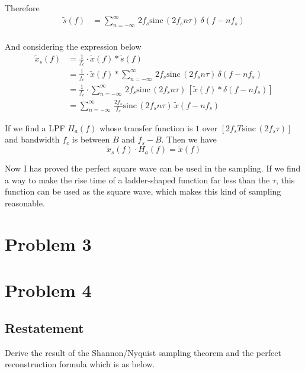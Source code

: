 \documentclass{article}
\begin{document}
Therefore
\begin{equation}
    \begin{aligned}
        \widetilde{s}(f) &= \sum_{n = -\infty}^{\infty}\, 2f_s \mathrm{sinc}\, ( 2f_s n\tau)\, \delta(f - nf_s) \\
    \end{aligned}
\end{equation}

And considering the expression below
\begin{equation}
    \begin{aligned}
        \widetilde{x}_s(f) &= \frac{1}{f_c} \cdot \widetilde{x}(f) * \widetilde{s}(f)\\
        &= \frac{1}{f_c} \cdot \widetilde{x}(f) * \sum_{n = -\infty}^{\infty}\, 2f_s \mathrm{sinc}\, ( 2f_s n\tau)\, \delta(f - nf_s) \\
        &= \frac{1}{f_c} \cdot \sum_{n = -\infty}^{\infty}\, 2f_s \mathrm{sinc}\, ( 2f_s n\tau)\, \left[ \widetilde{x}(f) *\delta(f - nf_s) \right] \\
        &= \sum_{n = -\infty}^{\infty}\,\frac{2f_s}{f_c} \mathrm{sinc}\, ( 2f_s n\tau)\, \widetilde{x}(f - nf_s)
    \end{aligned}
\end{equation}

If we find a LPF $H_a(f)$ whose transfer function is $1$ over $[2f_s T \mathrm{sinc}\, ( 2f_s\tau)]$ and bandwidth $f_c$ is between $B$ and $f_s - B$. Then we have
\begin{equation}
    \widetilde{x}_s(f) \cdot H_a(f) = \widetilde{x}(f)
\end{equation}

Now I has proved the perfect square wave can be used in the sampling. If we find a way to make the rise time of a ladder-shaped function far less than the $\tau$, this function can be used as the square wave, which makes this kind of sampling reasonable.


\section{Problem 3}

\section{Problem 4}
\subsection{Restatement}
Derive the result of the Shannon/Nyquist sampling theorem and the perfect reconstruction formula which is as below.
\end{document}
